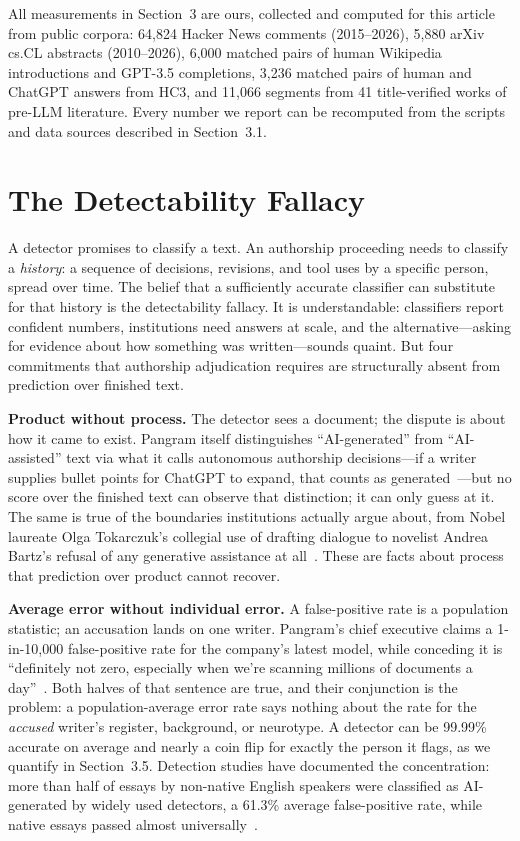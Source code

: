 \documentclass[sigconf,nonacm]{acmart}
\begin{document}
All measurements in Section~3 are ours, collected and computed for this article from public corpora: 64,824 Hacker News comments (2015--2026), 5{,}880 arXiv cs.CL abstracts (2010--2026), 6{,}000 matched pairs of human Wikipedia introductions and GPT-3.5 completions, 3{,}236 matched pairs of human and ChatGPT answers from HC3, and 11{,}066 segments from 41 title-verified works of pre-LLM literature. Every number we report can be recomputed from the scripts and data sources described in Section~3.1.

\section{The Detectability Fallacy}

A detector promises to classify a text. An authorship proceeding needs to classify a \emph{history}: a sequence of decisions, revisions, and tool uses by a specific person, spread over time. The belief that a sufficiently accurate classifier can substitute for that history is the detectability fallacy. It is understandable: classifiers report confident numbers, institutions need answers at scale, and the alternative---asking for evidence about how something was written---sounds quaint. But four commitments that authorship adjudication requires are structurally absent from prediction over finished text.

\noindent\textbf{Product without process.} The detector sees a document; the dispute is about how it came to exist. Pangram itself distinguishes ``AI-generated'' from ``AI-assisted'' text via what it calls autonomous authorship decisions---if a writer supplies bullet points for ChatGPT to expand, that counts as generated~\cite{r1}---but no score over the finished text can observe that distinction; it can only guess at it. The same is true of the boundaries institutions actually argue about, from Nobel laureate Olga Tokarczuk's collegial use of drafting dialogue to novelist Andrea Bartz's refusal of any generative assistance at all~\cite{r1}. These are facts about process that prediction over product cannot recover.

\noindent\textbf{Average error without individual error.} A false-positive rate is a population statistic; an accusation lands on one writer. Pangram's chief executive claims a 1-in-10,000 false-positive rate for the company's latest model, while conceding it is ``definitely not zero, especially when we're scanning millions of documents a day''~\cite{r1}. Both halves of that sentence are true, and their conjunction is the problem: a population-average error rate says nothing about the rate for the \emph{accused} writer's register, background, or neurotype. A detector can be 99.99\% accurate on average and nearly a coin flip for exactly the person it flags, as we quantify in Section~3.5. Detection studies have documented the concentration: more than half of essays by non-native English speakers were classified as AI-generated by widely used detectors, a 61.3\% average false-positive rate, while native essays passed almost universally~\cite{r3}.
\end{document}
